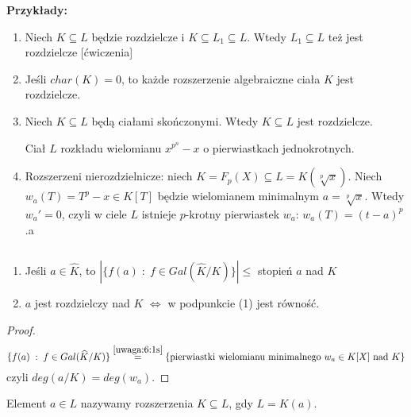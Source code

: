 \textbf{Przykłady:}
\begin{enumerate}
    \item Niech $K\subseteq L$ będzie rozdzielcze i $K\subseteq L_1\subseteq L$. Wtedy $L_1\subseteq L$ też jest rozdzielcze [ćwiczenia]
    \item Jeśli $char(K)=0$, to każde rozszerzenie algebraiczne ciała $K$ jest rozdzielcze.
    \item Niech $K\subseteq L$ będą ciałami skończonymi. Wtedy $K\subseteq L$ jest rozdzielcze.
    
    Ciał $L$ rozkładu wielomianu $x^{p^n}-x$ o pierwiastkach jednokrotnych.
    \item Rozszerzeni nierozdzielnicze: niech $K=F_p(X)\subseteq L=K(\sqrt[p]{x})$. Niech $w_a(T)=T^p-x\in K[T]$ będzie wielomianem minimalnym $a=\sqrt[p]{x}$. Wtedy $w_a'=0$, czyli w ciele $L$ istnieje $p$-krotny pierwiastek $w_a$: $w_a(T)=(t-a)^p$.a
\end{enumerate}

\begin{lemma}\label{lemat:6:7}
    $ $\newline
    \begin{enumerate}
        \item Jeśli $a\in\hat{K}$, to $|\{f(a)\;:\;f\in Gal(\hat{K}/K)\}|\leq$ stopień $a$ nad $K$
        \item $a$ jest rozdzielczy nad $K$ $\iff$ w podpunkcie (1) jest równość. 
    \end{enumerate}
\end{lemma}
\begin{proof}
    $$\{f(a)\;:\;f\in Gal(\hat{K}/K)\}\overset{\ref{uwaga:6:1s}}{=}\{\text{pierwiastki wielomianu minimalnego }w_a\in K[X]\text{ nad } K\}$$
    czyli $deg(a/K)=deg(w_a)$.
\end{proof}

\begin{bbox}
    Element $a\in L$ nazywamy  rozszerzenia $K\subseteq L$, gdy $L=K(a)$.
\end{bbox}

